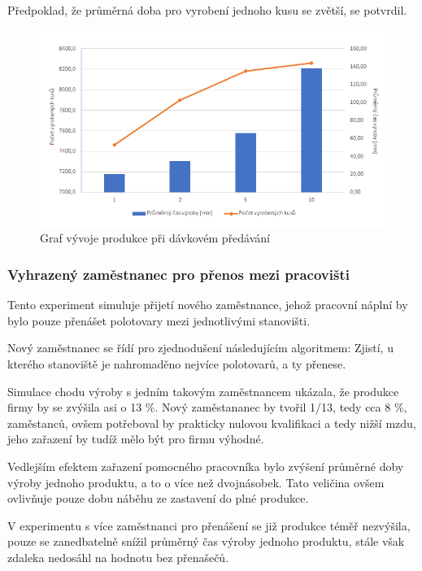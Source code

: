 \documentclass[11pt, a4paper]{article}
\begin{document}
Předpoklad, že průměrná doba pro vyrobení jednoho kusu se zvětší, se potvrdil.

\begin{figure}[H]
    \centering
    \includegraphics[width=17cm]{gr1}
    \caption{Graf vývoje produkce při dávkovém předávání}
    \label{gr1}
\end{figure}

\subsubsection{Vyhrazený zaměstnanec pro přenos mezi pracovišti}
Tento experiment simuluje přijetí nového zaměstnance, jehož pracovní náplní by bylo pouze přenášet polotovary mezi jednotlivými stanovišti.

Nový zaměstnanec se řídí pro zjednodušení následujícím algoritmem: Zjistí, u kterého stanoviště je nahromaděno nejvíce polotovarů, a ty přenese.

Simulace chodu výroby s jedním takovým zaměstnancem ukázala, že produkce firmy by se zvýšila asi o 13 \%. Nový zaměstananec by tvořil 1/13, tedy cca 8 \%, zaměstanců, ovšem potřeboval by prakticky nulovou kvalifikaci a tedy nižší mzdu, jeho zařazení by tudíž mělo být pro firmu výhodné.

Vedlejším efektem zařazení pomocného pracovníka bylo zvýšení průměrné doby výroby jednoho produktu, a to o více než dvojnásobek. Tato veličina ovšem ovlivňuje pouze dobu náběhu ze zastavení do plné produkce.


V experimentu s více zaměstnanci pro přenášení se již produkce téměř nezvýšila, pouze se zanedbatelně snížil průměrný čas výroby jednoho produktu, stále však zdaleka nedosáhl na hodnotu bez přenašečů.
\end{document}
